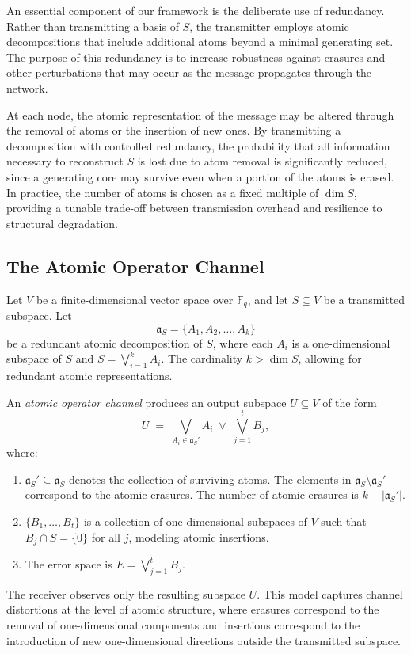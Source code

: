 \documentclass{svproc}
\begin{document}
An essential component of our framework is the deliberate use of redundancy.
Rather than transmitting a basis of $S$, the transmitter employs atomic
decompositions that include additional atoms beyond a minimal generating set.
The purpose of this redundancy is to increase robustness against erasures and
other perturbations that may occur as the message propagates through the
network.

At each node, the atomic representation of the message may be altered through
the removal of atoms or the insertion of new ones.
By transmitting a decomposition with controlled redundancy, the probability
that all information necessary to reconstruct $S$ is lost due to atom removal
is significantly reduced, since a generating core may survive even when a
portion of the atoms is erased.
In practice, the number of atoms is chosen as a fixed multiple of $\dim S$,
providing a tunable trade-off between transmission overhead and resilience to
structural degradation.

\subsection{The Atomic Operator Channel}

\begin{definition}
Let $V$ be a finite-dimensional vector space over $\mathbb{F}_q$, and let
$S \subseteq V$ be a transmitted subspace.
Let
\[
\mathfrak{a}_S = \{A_1, A_2, \dots, A_k\}
\]
be a redundant atomic decomposition of $S$, where each $A_i$ is a one-dimensional
subspace of $S$ and
\(
S= \bigvee_{i=1}^k A_i.
\)
The cardinality $k>\dim S$, allowing for redundant
atomic representations.

An \emph{atomic operator channel} produces an output subspace
$U \subseteq V$ of the form
\[
U
\;=\;
\bigvee_{A_i \in \mathfrak{a}_S'} A_i
\;\vee\;
\bigvee_{j=1}^{t} B_j,
\]
where:
\begin{enumerate}
    \item $\mathfrak{a}_S' \subseteq \mathfrak{a}_S$ denotes the collection of
    surviving atoms. The elements in $\mathfrak{a}_S\setminus\mathfrak{a}_S'$ correspond to the atomic erasures. The number of atomic erasures is $k - |\mathfrak{a}_S'|$.
    \item $\{B_1,\dots,B_t\}$ is a collection of one-dimensional subspaces of $V$
    such that $B_j \cap S = \{0\}$ for all $j$, modeling atomic insertions.
    \item The error space is $E = \bigvee_{j=1}^{t} B_j$.
\end{enumerate}

The receiver observes only the resulting subspace $U$.
This model captures channel distortions at the level of atomic structure,
where erasures correspond to the removal of one-dimensional components and
insertions correspond to the introduction of new one-dimensional directions
outside the transmitted subspace.
\end{definition}
\end{document}
